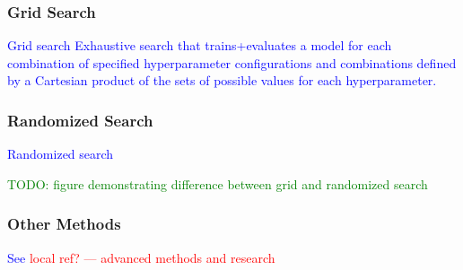 \subsubsection{Grid Search}

\textcolor{blue}{{Grid search} Exhaustive search that trains+evaluates a model for each combination of specified hyperparameter configurations and combinations defined by a Cartesian product of the sets of possible values for each hyperparameter.}

\subsubsection{Randomized Search}

\textcolor{blue}{{Randomized search} }

\textcolor{green}{TODO: figure demonstrating difference between grid and randomized search}

\subsubsection{Other Methods}

\textcolor{blue}{See \textcolor{red}{local ref? --- advanced methods and research}}








